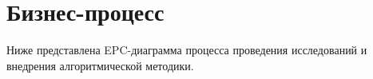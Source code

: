 \section{\Large{Бизнес-процесс}}

Ниже представлена EPC-диаграмма процесса проведения исследований и внедрения алгоритмической методики.
